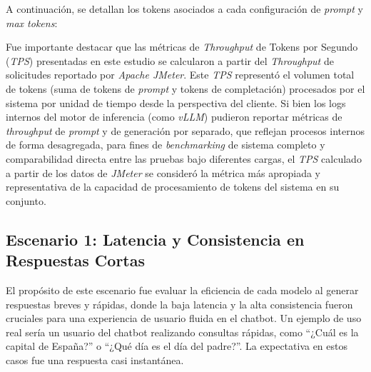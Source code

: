 A continuación, se detallan los tokens asociados a cada configuración de \textit{prompt} y \textit{max tokens}:

\begin{table}[H]
\centering
\renewcommand{\arraystretch}{1.2}
\setlength{\tabcolsep}{4pt}
\caption{Tokens asociados a cada configuración de \textit{prompt} y \textit{max tokens}.}
\label{tab:tokens_por_solicitud}
\end{table}

Fue importante destacar que las métricas de \textit{Throughput} de Tokens por Segundo (\textit{TPS}) presentadas en este estudio se calcularon a partir del \textit{Throughput} de solicitudes reportado por \textit{Apache JMeter}. Este \textit{TPS} representó el volumen total de tokens (suma de tokens de \textit{prompt} y tokens de completación) procesados por el sistema por unidad de tiempo desde la perspectiva del cliente. Si bien los logs internos del motor de inferencia (como \textit{vLLM}) pudieron reportar métricas de \textit{throughput} de \textit{prompt} y de generación por separado, que reflejan procesos internos de forma desagregada, para fines de \textit{benchmarking} de sistema completo y comparabilidad directa entre las pruebas bajo diferentes cargas, el \textit{TPS} calculado a partir de los datos de \textit{JMeter} se consideró la métrica más apropiada y representativa de la capacidad de procesamiento de tokens del sistema en su conjunto.

\subsection{Escenario 1: Latencia y Consistencia en Respuestas Cortas}
El propósito de este escenario fue evaluar la eficiencia de cada modelo al generar respuestas breves y rápidas, donde la baja latencia y la alta consistencia fueron cruciales para una experiencia de usuario fluida en el chatbot. Un ejemplo de uso real sería un usuario del chatbot realizando consultas rápidas, como ``¿Cuál es la capital de España?'' o ``¿Qué día es el día del padre?''. La expectativa en estos casos fue una respuesta casi instantánea.

